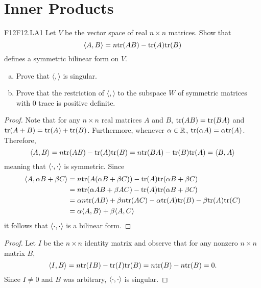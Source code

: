 \documentclass[../AlgebraQualSolutions.tex]{subfiles}
\begin{document}
\section{Inner Products}

\begin{prob}{F12}{F12.LA1}
    Let $V$ be the vector space of real $n \times n$ matrices. Show that 	
        \[\langle A, B \rangle = n \mathrm{tr}(AB) - \mathrm{tr}(A)\mathrm{tr}(B) \]
    defines a symmetric bilinear form on $V$.
    \begin{enumerate}[(a)]
    \item Prove that $\langle,\rangle$ is singular.
    \item Prove that the restriction of $\langle,\rangle$ to the subspace $W$ of symmetric matrices with 0 trace is positive definite.
    \end{enumerate}
    \end{prob}
    
    \begin{proof}
        Note that for any $n \times n$ real matrices $A$ and $B$, $\mathrm{tr}(AB) = \mathrm{tr}(BA)$ and $\mathrm{tr}(A+B) = \mathrm{tr}(A) + \mathrm{tr}(B)$. Furthermore, whenever $\alpha \in \mathbb{R}$, $\mathrm{tr}(\alpha A) = \alpha \mathrm{tr}(A)$. Therefore,
            \[\langle A, B\rangle = n \mathrm{tr}(AB) - \mathrm{tr}(A)\mathrm{tr}(B) = n \mathrm{tr}(BA) - \mathrm{tr}(B)\mathrm{tr}(A) = \langle B, A\rangle\]
        meaning that $\langle \cdot, \cdot\rangle$ is symmetric. Since
            \begin{align*}
                \langle A, \alpha B + \beta C\rangle &= n\mathrm{tr}(A(\alpha B + \beta C)) - \mathrm{tr}(A) \mathrm{tr}(\alpha B + \beta C)\\
                &= n\mathrm{tr}(\alpha AB + \beta AC) - \mathrm{tr}(A) \mathrm{tr}(\alpha B + \beta C)\\
                &= \alpha n \mathrm{tr}(AB) + \beta n \mathrm{tr}(AC) - \alpha \mathrm{tr}(A)\mathrm{tr}(B) - \beta \mathrm{tr}(A)\mathrm{tr}(C)\\
                &= \alpha \langle A, B\rangle + \beta\langle A, C\rangle
            \end{align*}
        it follows that $\langle \cdot, \cdot\rangle$ is a bilinear form.
    \end{proof}
    
    \begin{proof}
        Let $I$ be the $n \times n$ identity matrix and observe that for any nonzero $n \times n$ matrix $B$,
            \[\langle I, B\rangle = n\mathrm{tr}(IB) - \mathrm{tr}(I)\mathrm{tr}(B) = n\mathrm{tr}(B) - n \mathrm{tr}(B) = 0.\]
        Since $I \neq 0$ and $B$ was arbitrary, $\langle \cdot, \cdot\rangle$ is singular.
    \end{proof}
    
\end{document}
